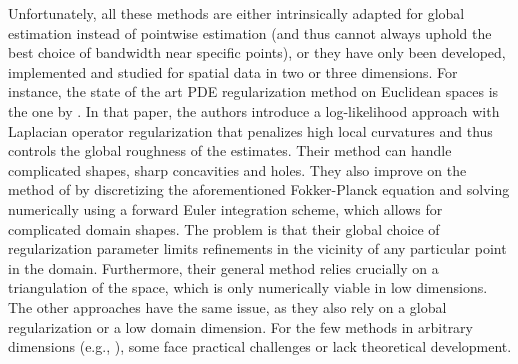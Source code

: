\documentclass[bj,authoryear]{imsart}
\numberwithin{equation}{section}
\theoremstyle{plain}
\theoremstyle{remark}
\newcommand{\1}{\mathds{1}}
\begin{document}
    Unfortunately, all these methods are either intrinsically adapted for global estimation instead of pointwise estimation (and thus cannot always uphold the best choice of bandwidth near specific points), or they have only been developed, implemented and studied for spatial data in two or three dimensions.
    For instance, the state of the art PDE regularization method on Euclidean spaces is the one by \cite{Ferraccioli_et_al2021}. In that paper, the authors introduce a log-likelihood approach with Laplacian operator regularization that penalizes high local curvatures and thus controls the global roughness of the estimates. Their method can handle complicated shapes, sharp concavities and holes. They also improve on the method of \cite{BotevGrotowskiKroese2010} by discretizing the aforementioned Fokker-Planck equation and solving numerically using a forward Euler integration scheme, which allows for complicated domain shapes. The problem is that their global choice of regularization parameter limits refinements in the vicinity of any particular point in the domain. Furthermore, their general method relies crucially on a triangulation of the space, which is only numerically viable in low dimensions. The other approaches have the same issue, as they also rely on a global regularization or a low domain dimension. For the few methods in arbitrary dimensions (e.g., \cite{Niu_et_al2019, BarryMcIntyre2020}), some face practical challenges or lack theoretical development.
\end{document}
